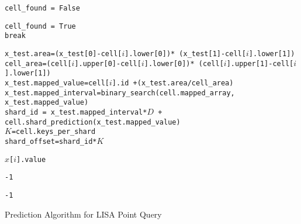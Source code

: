 \begin{algorithm}[H]
    \SetAlgoLined
    \texttt{cell\_found = False }\\
    {
        {
            {
		    \texttt{cell\_found = True }\\
		    \texttt{break }
		   
		   }
		}
    }
     {
          \texttt{x\_test.area=(x\_test[0]-cell[$i$].lower[0])*
                (x\_test[1]-cell[$i$].lower[1])}\\
        \texttt{cell\_area=(cell[$i$].upper[0]-cell[$i$].lower[0])*
        (cell[$i$].upper[1]-cell[$i$].lower[1])}\\
           \texttt{x\_test.mapped\_value=cell[$i$].id +(x\_test.area\slash cell\_area)}\\
           \texttt{x\_test.mapped\_interval=binary\_search(cell.mapped\_array, x\_test.mapped\_value)}\\
           \texttt{shard\_id = x\_test.mapped\_interval*$D$ + cell.shard\_prediction(x\_test.mapped\_value) }\\
           \texttt{$K$=cell.keys\_per\_shard}\\
           \texttt{shard\_offset=shard\_id*$K$ }\\
            {   
                    {
		   	            \Return \texttt{$x$[$i$].value}
		   
		            }
            }
                       
           
           \Return \texttt{-1}
       }
  
 	 	\Return \texttt{-1}
     \caption{Prediction Algorithm for LISA Point Query }
     \label{algo:Lisa_point_query}
\end{algorithm}


